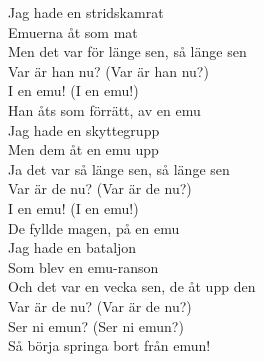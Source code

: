 \documentclass[a6paper, 10pt, twoside]{article}
\begin{document}
\begin{center}
\end{center}
\begin{lyrics}
Jag hade en stridskamrat\\
Emuerna åt som mat\\
Men det var för länge sen, så länge sen\\
Var är han nu? (Var är han nu?)\\
I en emu! (I en emu!)\\
Han åts som förrätt, av en emu
\vspace{5pt}\\
Jag hade en skyttegrupp\\
Men dem åt en emu upp\\
Ja det var så länge sen, så länge sen\\
Var är de nu? (Var är de nu?)\\
I en emu! (I en emu!)\\
De fyllde magen, på en emu
\vspace{5pt}\\
Jag hade en bataljon\\
Som blev en emu-ranson\\
Och det var en vecka sen, de åt upp den\\
Var är de nu? (Var är de nu?)\\
Ser ni emun? (Ser ni emun?)\\
Så börja springa bort från emun!
\end{lyrics}
\end{document}
